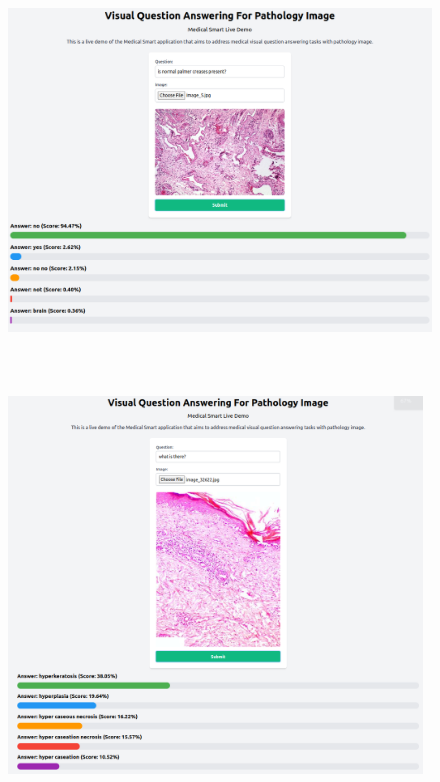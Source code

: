   \begin{figure}[H]
    \centering
    \includegraphics[width=\textwidth, height=11cm]{image/lampiran/patologi-3.png}
  \end{figure}

  \begin{figure}[H]
    \centering
    \includegraphics[width=\textwidth, height=10cm]{image/lampiran/patologi-4.png}
  \end{figure}
  


